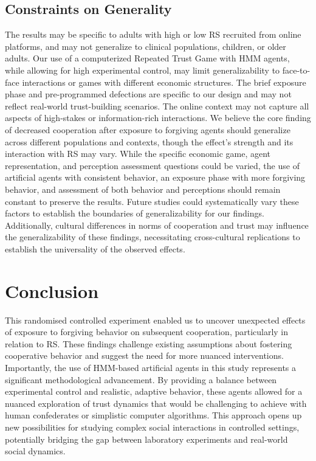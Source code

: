 \documentclass[
]{article}
\begin{document}
\subsection{Constraints on Generality}\label{constraints-on-generality}

The results may be specific to adults with high or low RS recruited from
online platforms, and may not generalize to clinical populations,
children, or older adults. Our use of a computerized Repeated Trust Game
with HMM agents, while allowing for high experimental control, may limit
generalizability to face-to-face interactions or games with different
economic structures. The brief exposure phase and pre-programmed
defections are specific to our design and may not reflect real-world
trust-building scenarios. The online context may not capture all aspects
of high-stakes or information-rich interactions. We believe the core
finding of decreased cooperation after exposure to forgiving agents
should generalize across different populations and contexts, though the
effect's strength and its interaction with RS may vary. While the
specific economic game, agent representation, and perception assessment
questions could be varied, the use of artificial agents with consistent
behavior, an exposure phase with more forgiving behavior, and assessment
of both behavior and perceptions should remain constant to preserve the
results. Future studies could systematically vary these factors to
establish the boundaries of generalizability for our findings.
Additionally, cultural differences in norms of cooperation and trust may
influence the generalizability of these findings, necessitating
cross-cultural replications to establish the universality of the
observed effects.

\section{Conclusion}\label{conclusion}

This randomised controlled experiment enabled us to uncover unexpected
effects of exposure to forgiving behavior on subsequent cooperation,
particularly in relation to RS. These findings challenge existing
assumptions about fostering cooperative behavior and suggest the need
for more nuanced interventions. Importantly, the use of HMM-based
artificial agents in this study represents a significant methodological
advancement. By providing a balance between experimental control and
realistic, adaptive behavior, these agents allowed for a nuanced
exploration of trust dynamics that would be challenging to achieve with
human confederates or simplistic computer algorithms. This approach
opens up new possibilities for studying complex social interactions in
controlled settings, potentially bridging the gap between laboratory
experiments and real-world social dynamics.
\end{document}
